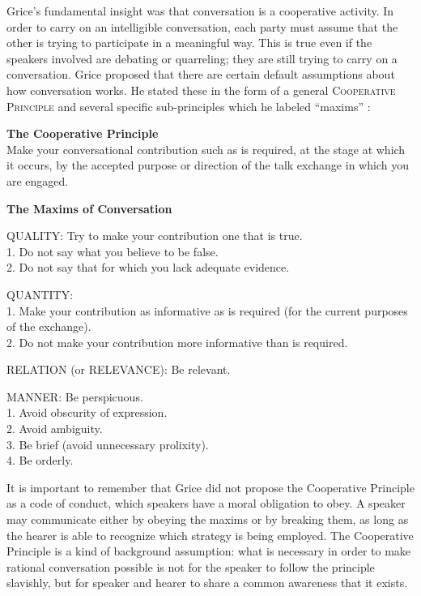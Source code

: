 Grice’s fundamental insight was that conversation is a cooperative activity. In order to carry on an intelligible conversation, each party must assume that the other is trying to participate in a meaningful way. This is true even if the speakers involved are debating or quarreling; they are still trying to carry on a conversation. Grice proposed that there are certain default assumptions about how conversation works. He stated these in the form of a general \textsc{Cooperative Principle}  and several specific sub-principles which he labeled “maxims” :


\ea \label{ex:8.5}
\textbf{The Cooperative Principle} \citep[45]{Grice1975}\\
Make your conversational contribution such as is required, at the stage at which it occurs, by the accepted purpose or direction of the talk exchange in which you are engaged.
\z

\ea \label{ex:8.6}
\textbf{The Maxims of Conversation} \citep[45-46]{Grice1975}

QUALITY: Try to make your contribution one that is true.\\
1. Do not say what you believe to be false.\\
2. Do not say that for which you lack adequate evidence.

QUANTITY:\\
1. Make your contribution as informative as is required (for the current purposes of the exchange).\\
2. Do not make your contribution more informative than is required.

RELATION (or RELEVANCE): Be relevant.
 
MANNER: Be perspicuous.\\
1. Avoid obscurity of expression.\\
2. Avoid ambiguity.\\
3. Be brief (avoid unnecessary prolixity).\\
4. Be orderly.
\z


It is important to remember that Grice did not propose the Cooperative Principle as a code of conduct, which speakers have a moral obligation to obey. A speaker may communicate either by obeying the maxims or by breaking them, as long as the hearer is able to recognize which strategy is being employed. The Cooperative Principle is a kind of background assumption: what is necessary in order to make rational conversation possible is not for the speaker to follow the principle slavishly, but for speaker and hearer to share a common awareness that it exists.



